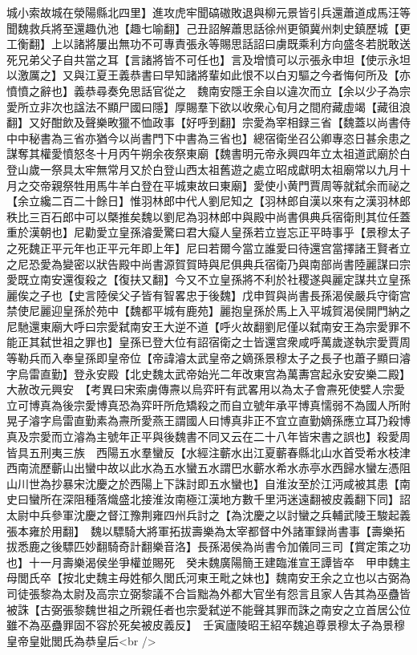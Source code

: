 城小索故城在滎陽縣北四里】進攻虎牢聞碻磝敗退與柳元景皆引兵還蕭道成馬汪等聞魏救兵將至還趣仇池【趣七喻翻】己丑詔解蕭思話徐州更領冀州刺史鎮歷城【更工衡翻】上以諸將屢出無功不可專責張永等賜思話詔曰虜既乘利方向盛冬若脱敢送死兄弟父子自共當之耳【言諸將皆不可任也】言及增憤可以示張永申坦【使示永坦以激厲之】又與江夏王義恭書曰早知諸將輩如此恨不以白刃驅之今者悔何所及【亦憤憤之辭也】義恭尋奏免思話官從之　魏南安隱王余自以違次而立【余以少子為宗愛所立非次也諡法不顯尸國曰隱】厚賜羣下欲以收衆心旬月之間府藏虛竭【藏徂浪翻】又好酣飲及聲樂畋獵不恤政事【好呼到翻】宗愛為宰相録三省【魏蓋以尚書侍中中秘書為三省亦猶今以尚書門下中書為三省也】總宿衛坐召公卿專恣日甚余患之謀奪其權愛憤怒冬十月丙午朔余夜祭東廟【魏書明元帝永興四年立太祖道武廟於白登山歲一祭具太牢無常月又於白登山西太祖舊遊之處立昭成獻明太祖廟常以九月十月之交帝親祭牲用馬牛羊白登在平城東故曰東廟】愛使小黄門賈周等就弑余而祕之【余立纔二百二十餘日】惟羽林郎中代人劉尼知之【羽林郎自漢以來有之漢羽林郎秩比三百石郎中可以槩推矣魏以劉尼為羽林郎中與殿中尚書俱典兵宿衛則其位任蓋重於漢朝也】尼勸愛立皇孫濬愛驚曰君大癡人皇孫若立豈忘正平時事乎【景穆太子之死魏正平元年也正平元年即上年】尼曰若爾今當立誰愛曰待還宫當擇諸王賢者立之尼恐愛為變密以狀告殿中尚書源賀賀時與尼俱典兵宿衛乃與南部尚書陸麗謀曰宗愛既立南安還復殺之【復扶又翻】今又不立皇孫將不利於社稷遂與麗定謀共立皇孫麗俟之子也【史言陸侯父子皆有智畧忠于後魏】戊申賀與尚書長孫渴侯嚴兵守衛宫禁使尼麗迎皇孫於苑中【魏都平城有鹿苑】麗抱皇孫於馬上入平城賀渴侯開門納之尼馳還東廟大呼曰宗愛弑南安王大逆不道【呼火故翻劉尼僅以弑南安王為宗愛罪不能正其弑世祖之罪也】皇孫已登大位有詔宿衛之士皆還宫衆咸呼萬歲遂執宗愛賈周等勒兵而入奉皇孫即皇帝位【帝諱濬太武皇帝之嫡孫景穆太子之長子也蕭子顯曰濬字烏雷直勤】登永安殿【北史魏太武帝始光二年改東宫為萬夀宫起永安安樂二殿】大赦改元興安　【考異曰宋索虜傳燾以烏弈旰有武畧用以為太子會燾死使嬖人宗愛立可博真為後宗愛博真恐為弈旰所危矯殺之而自立號年承平博真懦弱不為國人所附晃子濬字烏雷直勤素為燾所愛燕王謂國人曰博真非正不宜立直勤嫡孫應立耳乃殺博真及宗愛而立濬為主號年正平與後魏書不同又云在二十八年皆宋書之誤也】殺愛周皆具五刑夷三族　西陽五水羣蠻反【水經注蘄水出江夏蘄春縣北山水首受希水枝津西南流歷蘄山出蠻中故以此水為五水蠻五水謂巴水蘄水希水赤亭水西歸水蠻左憑阻山川世為抄暴宋沈慶之於西陽上下誅討即五水蠻也】自淮汝至於江沔咸被其患【南史曰蠻所在深阻種落熾盛北接淮汝南極江漢地方數千里沔迷遠翻被皮義翻下同】詔太尉中兵參軍沈慶之督江豫荆雍四州兵討之【為沈慶之以討蠻之兵輔武陵王駿起義張本雍於用翻】　魏以驃騎大將軍拓拔壽樂為太宰都督中外諸軍録尚書事【壽樂拓拔悉鹿之後驃匹妙翻騎奇計翻樂音洛】長孫渴侯為尚書令加儀同三司【賞定策之功也】十一月壽樂渴侯坐爭權並賜死　癸未魏廣陽簡王建臨淮宣王譚皆卒　甲申魏主母閭氏卒【按北史魏主母姓郁久閭氏河東王毗之妹也】魏南安王余之立也以古弼為司徒張黎為太尉及高宗立弼黎議不合旨黜為外都大官坐有怨言且家人告其為巫蠱皆被誅【古弼張黎魏世祖之所親任者也宗愛弑逆不能聲其罪而誅之南安之立首居公位雖不為巫蠱罪固不容於死矣被皮義反】　壬寅廬陵昭王紹卒魏追尊景穆太子為景穆皇帝皇妣閭氏為恭皇后<br />

